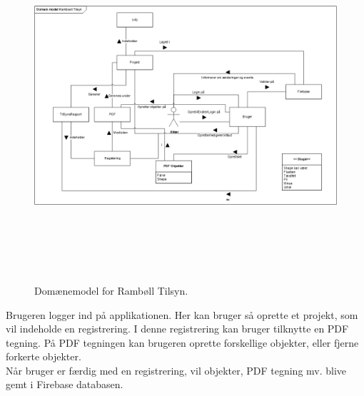 \begin{figure}[H] %
	\centering
	\includegraphics[height=13cm, width=17cm]{../ArkitekturDesign/OverordnetArkitektur/Domainmodel}
	\caption{Domænemodel for Rambøll Tilsyn.}
	\label{fig:Domain}
\end{figure}
Brugeren logger ind på applikationen. Her kan bruger så oprette et projekt, som vil indeholde en registrering. I denne registrering kan bruger tilknytte en PDF tegning. På PDF tegningen kan brugeren oprette forskellige objekter, eller fjerne forkerte objekter. \\
Når bruger er færdig med en registrering, vil objekter, PDF tegning mv. blive gemt i Firebase databasen.

\clearpage